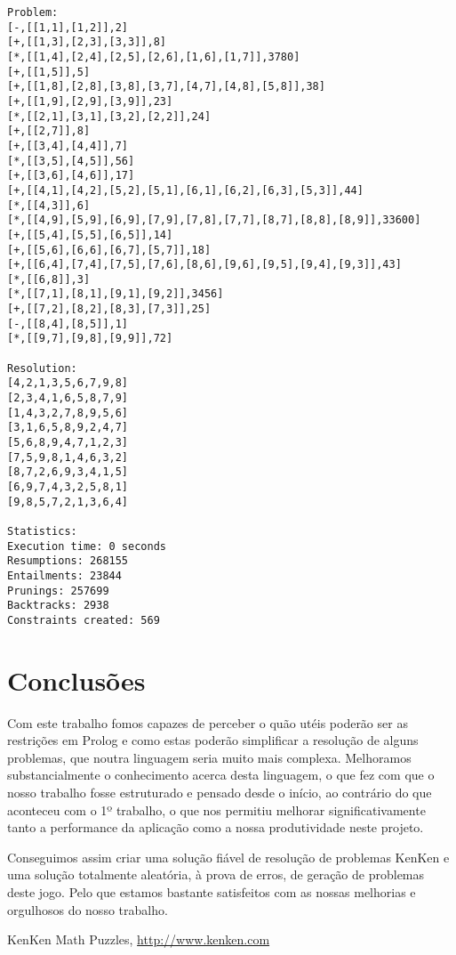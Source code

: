 \documentclass[runningheads,a4paper]{llncs}
\begin{document}
\begin{lstlisting}
Problem:
[-,[[1,1],[1,2]],2]
[+,[[1,3],[2,3],[3,3]],8]
[*,[[1,4],[2,4],[2,5],[2,6],[1,6],[1,7]],3780]
[+,[[1,5]],5]
[+,[[1,8],[2,8],[3,8],[3,7],[4,7],[4,8],[5,8]],38]
[+,[[1,9],[2,9],[3,9]],23]
[*,[[2,1],[3,1],[3,2],[2,2]],24]
[+,[[2,7]],8]
[+,[[3,4],[4,4]],7]
[*,[[3,5],[4,5]],56]
[+,[[3,6],[4,6]],17]
[+,[[4,1],[4,2],[5,2],[5,1],[6,1],[6,2],[6,3],[5,3]],44]
[*,[[4,3]],6]
[*,[[4,9],[5,9],[6,9],[7,9],[7,8],[7,7],[8,7],[8,8],[8,9]],33600]
[+,[[5,4],[5,5],[6,5]],14]
[+,[[5,6],[6,6],[6,7],[5,7]],18]
[+,[[6,4],[7,4],[7,5],[7,6],[8,6],[9,6],[9,5],[9,4],[9,3]],43]
[*,[[6,8]],3]
[*,[[7,1],[8,1],[9,1],[9,2]],3456]
[+,[[7,2],[8,2],[8,3],[7,3]],25]
[-,[[8,4],[8,5]],1]
[*,[[9,7],[9,8],[9,9]],72]

Resolution:
[4,2,1,3,5,6,7,9,8]
[2,3,4,1,6,5,8,7,9]
[1,4,3,2,7,8,9,5,6]
[3,1,6,5,8,9,2,4,7]
[5,6,8,9,4,7,1,2,3]
[7,5,9,8,1,4,6,3,2]
[8,7,2,6,9,3,4,1,5]
[6,9,7,4,3,2,5,8,1]
[9,8,5,7,2,1,3,6,4]

Statistics:
Execution time: 0 seconds
Resumptions: 268155
Entailments: 23844
Prunings: 257699
Backtracks: 2938
Constraints created: 569
\end{lstlisting}


\section{Conclusões}

Com este trabalho fomos capazes de perceber o quão utéis poderão ser as restrições em Prolog e como estas poderão simplificar a resolução de alguns problemas, que noutra linguagem seria muito mais complexa.
Melhoramos substancialmente o conhecimento acerca desta linguagem, o que fez com que o nosso trabalho fosse estruturado e pensado desde o início, ao contrário do que aconteceu com o 1º trabalho, o que nos permitiu melhorar significativamente tanto a performance da aplicação como a nossa produtividade neste projeto.


Conseguimos assim criar uma solução fiável de resolução de problemas KenKen e uma solução totalmente aleatória, à prova de erros, de geração de problemas deste jogo.
Pelo que estamos bastante satisfeitos com as nossas melhorias e orgulhosos do nosso trabalho.



\begin{thebibliography}{4}

 KenKen Math Puzzles, \url{http://www.kenken.com}

\end{thebibliography}
\end{document}
